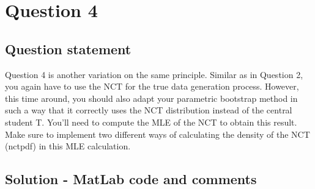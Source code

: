 \documentclass[12pt]{article}
\begin{document}
\newpage

\section{Question 4}
\subsection*{Question statement}

Question 4 is another variation on the same principle. Similar as in Question 2, you again have to use the NCT for the true data generation process. However, this time around, you should also adapt your parametric bootstrap method in such a way that it correctly uses the NCT distribution instead of the central student T.\newline
You'll need to compute the MLE of the NCT to obtain this result. Make sure to implement two different ways of calculating the density of the NCT (nctpdf) in this MLE calculation.

\subsection*{Solution - MatLab code and comments}
\end{document}

